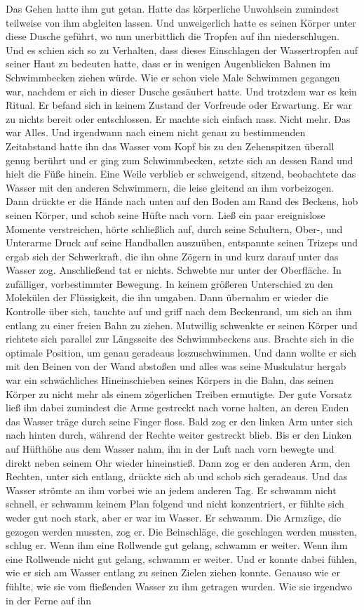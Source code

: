 \documentclass[ngerman,smalldemyvopaper,11pt,oneside,onecolumn,openright,extrafontsizes]{memoir}
\begin{document}
Das Gehen hatte ihm gut getan. Hatte das körperliche Unwohlsein zumindest teilweise von ihm abgleiten lassen. Und unweigerlich hatte es seinen Körper unter diese Dusche geführt, wo nun unerbittlich die Tropfen auf ihn niederschlugen. Und es schien sich so zu Verhalten, dass dieses Einschlagen der Wassertropfen auf seiner Haut zu bedeuten hatte, dass er in wenigen Augenblicken Bahnen im Schwimmbecken ziehen würde. Wie er schon viele Male Schwimmen gegangen war, nachdem er sich in dieser Dusche gesäubert hatte. Und trotzdem war es kein Ritual. Er befand sich in keinem Zustand der Vorfreude oder Erwartung. Er war zu nichts bereit oder entschlossen. Er machte sich einfach nass. Nicht mehr. Das war Alles. Und irgendwann nach einem nicht genau zu bestimmenden Zeitabstand hatte ihn das Wasser vom Kopf bis zu den Zehenspitzen überall genug berührt und er ging zum Schwimmbecken, setzte sich an dessen Rand und hielt die Füße hinein. Eine Weile verblieb er schweigend, sitzend, beobachtete das Wasser mit den anderen Schwimmern, die leise gleitend an ihm vorbeizogen. Dann drückte er die Hände nach unten auf den Boden am Rand des Beckens, hob seinen Körper, und schob seine Hüfte nach vorn. Ließ ein paar ereignislose Momente verstreichen, hörte schließlich auf, durch seine Schultern, Ober-, und Unterarme Druck auf seine Handballen auszuüben, entspannte seinen Trizeps und ergab sich der Schwerkraft, die ihn ohne Zögern in und kurz darauf unter das Wasser zog. Anschließend tat er nichts. Schwebte nur unter der Oberfläche. In zufälliger, vorbestimmter Bewegung. In keinem größeren Unterschied zu den Molekülen der Flüssigkeit, die ihn umgaben. Dann übernahm er wieder die Kontrolle über sich, tauchte auf und griff nach dem Beckenrand, um sich an ihm entlang zu einer freien Bahn zu ziehen. Mutwillig schwenkte er seinen Körper und richtete sich parallel zur Längsseite des Schwimmbeckens aus. Brachte sich in die optimale Position, um genau geradeaus loszuschwimmen. Und dann wollte er sich mit den Beinen von der Wand abstoßen und alles was seine Muskulatur hergab war ein schwächliches Hineinschieben seines Körpers in die Bahn, das seinen Körper zu nicht mehr als einem zögerlichen Treiben ermutigte. Der gute Vorsatz ließ ihn dabei zumindest die Arme gestreckt nach vorne halten, an deren Enden das Wasser träge durch seine Finger floss. Bald zog er den linken Arm unter sich nach hinten durch, während der Rechte weiter gestreckt blieb. Bis er den Linken auf Hüfthöhe aus dem Wasser nahm, ihn in der Luft nach vorn bewegte und direkt neben seinem Ohr wieder hineinstieß. Dann zog er den anderen Arm, den Rechten, unter sich entlang, drückte sich ab und schob sich geradeaus. Und das Wasser strömte an ihm vorbei wie an jedem anderen Tag. Er schwamm nicht schnell, er schwamm keinem Plan folgend und nicht konzentriert, er fühlte sich weder gut noch stark, aber er war im Wasser. Er schwamm. Die Armzüge, die gezogen werden mussten, zog er. Die Beinschläge, die geschlagen werden mussten, schlug er. Wenn ihm eine Rollwende gut gelang, schwamm er weiter. Wenn ihm eine Rollwende nicht gut gelang, schwamm er weiter. Und er konnte dabei fühlen, wie er sich am Wasser entlang zu seinen Zielen ziehen konnte. Genauso wie er fühlte, wie sie vom fließenden Wasser zu ihm getragen wurden. Wie sie irgendwo in der Ferne auf ihn 
\end{document}
